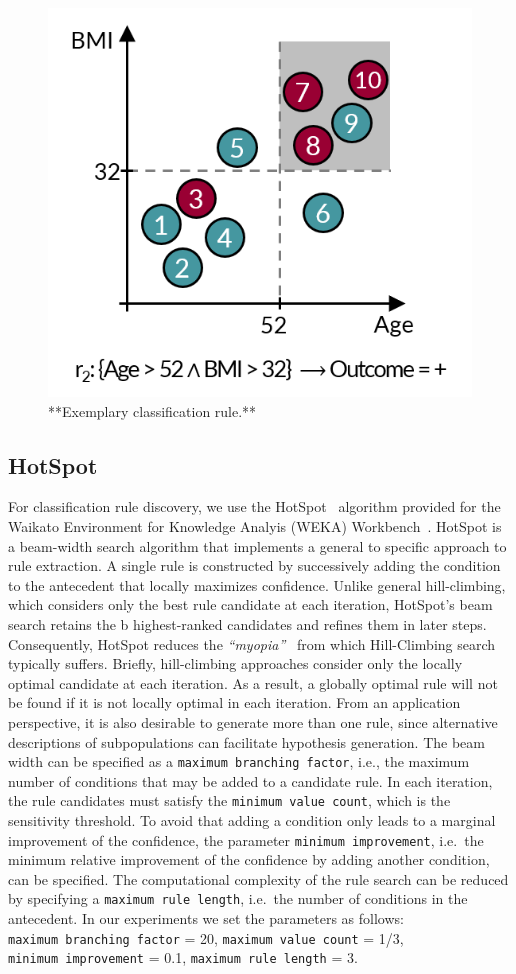 \documentclass[
  oneside]{book}
\begin{document}
\begin{figure}[h]

{\centering \includegraphics[width=0.5\linewidth]{figures/03-rule-intro} 

}

\caption{**Exemplary classification rule.**}\label{fig:03-rule-intro}
\end{figure}

\hypertarget{imm-workflow-hotspot}{%
\subsection{HotSpot}\label{imm-workflow-hotspot}}

For classification rule discovery, we use the HotSpot~\autocite{hotspot2012} algorithm provided for the Waikato Environment for Knowledge Analyis (WEKA) Workbench~\autocite{FrankEtAl:Weka2016}.
HotSpot is a beam-width search algorithm that implements a general to specific approach to rule extraction.
A single rule is constructed by successively adding the condition to the antecedent that locally maximizes confidence.
Unlike general hill-climbing, which considers only the best rule candidate at each iteration, HotSpot's beam search retains the b highest-ranked candidates and refines them in later steps.
Consequently, HotSpot reduces the \emph{``myopia''}~\autocite{Fuernkranz:12} from which Hill-Climbing search typically suffers.
Briefly, hill-climbing approaches consider only the locally optimal candidate at each iteration.
As a result, a globally optimal rule will not be found if it is not locally optimal in each iteration.
From an application perspective, it is also desirable to generate more than one rule, since alternative descriptions of subpopulations can facilitate hypothesis generation.
The beam width can be specified as a \texttt{maximum\ branching\ factor}, i.e., the maximum number of conditions that may be added to a candidate rule.
In each iteration, the rule candidates must satisfy the \texttt{minimum\ value\ count}, which is the sensitivity threshold.
To avoid that adding a condition only leads to a marginal improvement of the confidence, the parameter \texttt{minimum\ improvement}, i.e.~the minimum relative improvement of the confidence by adding another condition, can be specified.
The computational complexity of the rule search can be reduced by specifying a \texttt{maximum\ rule\ length}, i.e.~the number of conditions in the antecedent.
In our experiments we set the parameters as follows: \texttt{maximum\ branching\ factor} = 20, \texttt{maximum\ value\ count} = 1/3, \texttt{minimum\ improvement} = 0.1, \texttt{maximum\ rule\ length} = 3.
\end{document}
